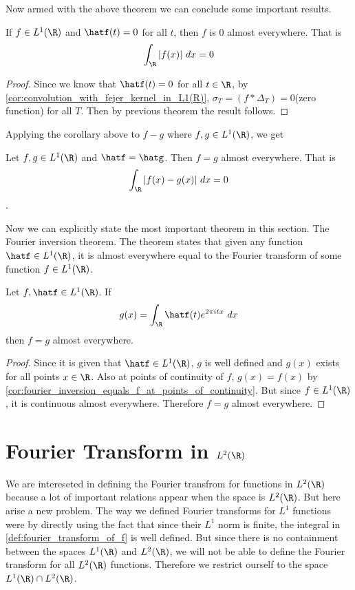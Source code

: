 Now armed with the above theorem we can conclude some important results.
\begin{corollary}
  If $f\in L^1(\R)$ and $\hatf(t) = 0$ for all $t$, then $f$ is $0$ almost everywhere. That is $$\int_\R |f(x)| \ dx = 0$$
\end{corollary}
\begin{proof}
  Since we know that $\hatf(t)= 0$ for all $t\in \R$, by \autoref{cor:convolution_with_fejer_kernel_in_L1(R)}, $\sigma_T = (f*\Delta_T) =0$(zero function) for all $T$. Then by previous theorem the result follows. 
\end{proof}

Applying the corollary above to $f-g$ where $f, g \in L^1(\R)$, we get
\begin{corollary}
  \label{cor:functions_with_same_fourier_transform_in_R}
  Let $f, g \in L^1(\R)$ and $\hatf = \hatg$. Then $f=g$ almost everywhere. That is $$\int_\R |f(x) - g(x)| \ dx = 0$$.
\end{corollary}

  Now we can explicitly state the most important theorem in this section. The Fourier inversion theorem. The theorem states that given any function $\hatf \in L^1(\R)$, it is almost everywhere equal to the Fourier transform of some function $f \in L^1(\R)$.
\begin{theorem}
  \label{thm:fourier_inversion_in_L1}
  Let $f, \hatf \in L^1(\R)$. If$$g(x) = \int_\R \hatf(t) e^{2\pi itx} \ dx$$
  then $f=g$ almost everywhere.
\end{theorem}
\begin{proof}
  Since it is given that $\hatf \in L^1(\R)$, $g$ is well defined and $g(x)$ exists for all points $x \in \R$. Also at points of continuity of $f$, $g(x) = f(x)$ by \autoref{cor:fourier_inversion_equals_f_at_points_of_continuity}. But since $f \in L^1(\R)$, it is continuous almost everywhere. Therefore $f = g$ almost everywhere. 

\end{proof}


\section{Fourier Transform in $L^2(\R)$}
We are intereseted in defining the Fourier transfrom for functions in $L^2(\R)$ because a lot of important relations appear when the space is $L^2(\R)$. But here arise a new problem. The way we defined Fourier transforms for $L^1$ functions were by directly using the fact that since their $L^1$ norm is finite, the integral in \autoref{def:fourier_transform_of_f} is well defined. But since there is no containment between the spaces $L^1(\R)$ and $L^2(\R)$, we will not be able to define the Fourier transform for all $L^2(\R)$ functions. Therefore we restrict ourself to the space $L^1(\R) \cap L^2(\R)$. 

